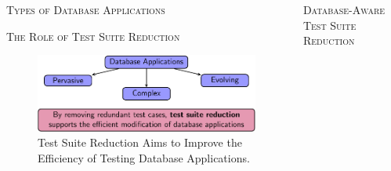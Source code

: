 \documentclass[final,t]{beamer}
\begin{document}
\begin{frame}{}
\begin{columns}[t]
\begin{column}{.325\linewidth}
\begin{block}{\textsc{Types of Database Applications}}
   	\end{block}

   	\begin{block}{\textsc{The Role of Test Suite Reduction}}

          \begin{figure}			
  	    \centering
            \includegraphics[width=.95\linewidth]{test_suite_reduction_rescue_wrapper_crop}
            \vspace*{.05in}
	    \caption{Test Suite Reduction Aims to Improve the
              Efficiency of Testing Database Applications.}
            
	  \end{figure}          

	\end{block}
      \end{column}   
      
%
%
      \begin{column}{.325\linewidth}
   		
	\begin{block}{\textsc{Database-Aware Test Suite Reduction}}


\end{block}
\end{column}
\end{columns}
\end{frame}
\end{document}

